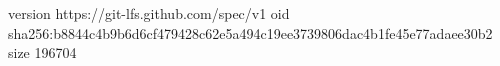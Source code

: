 version https://git-lfs.github.com/spec/v1
oid sha256:b8844c4b9b6d6cf479428c62e5a494c19ee3739806dac4b1fe45e77adaee30b2
size 196704
